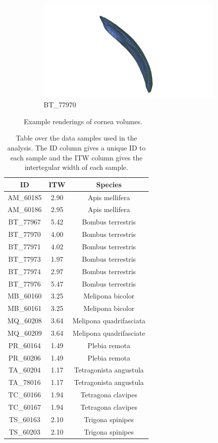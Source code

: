 \begin{figure}[h]
\begin{subfigure}{.3 \linewidth}
  \centering
  \includegraphics[scale=0.2]{bt77970_cornea.png}
  \caption{BT\_77970}
  \end{subfigure}
  \caption{\label{corneas} Example renderings of cornea volumes.}
\end{figure}
\begin{table}[htb]
\begin{center}
\begin{tabular}{ | c | c | c | }
\hline
  ID & ITW & Species \\
\hline
AM\_60185 & 2.90 & Apis mellifera \\
AM\_60186 & 2.95 & Apis mellifera \\
BT\_77967 & 5.42 & Bombus terrestris \\
BT\_77970 & 4.00 & Bombus terrestris \\
BT\_77971 & 4.02 & Bombus terrestris \\
BT\_77973 & 1.97 & Bombus terrestris \\
BT\_77974 & 2.97 & Bombus terrestris \\
BT\_77976 & 5.47 & Bombus terrestris \\
MB\_60160 & 3.25 & Melipona bicolor \\
MB\_60161 & 3.25 & Melipona bicolor \\
MQ\_60208 & 3.64 & Melipona quadrifasciata \\
MQ\_60209 & 3.64 & Melipona quadrifasciate \\
PR\_60164 & 1.49 & Plebia remota \\
PR\_60206 & 1.49 & Plebia remota \\
TA\_60204 & 1.17 & Tetragonista angustula \\
TA\_78016 & 1.17 & Tetragonista angustula \\
TC\_60166 & 1.94 & Tetragona clavipes \\
TC\_60167 & 1.94 & Tetragona clavipes \\
TS\_60163 & 2.10 & Trigona spinipes \\
TS\_60203 & 2.10 & Trigona spinipes \\
  \hline
\end{tabular}
\caption{Table over the data samples used in the analysis. The ID column gives a unique ID to each sample and the ITW column gives the intertegular width of each sample.}
\label{bees}
\end{center}
\end{table}
